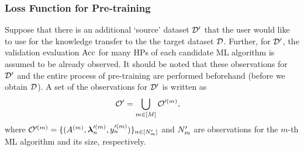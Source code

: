 \subsubsection{Loss Function for Pre-training}
\label{sssec:pre-train-formulation}


Suppose that there is an additional `source' dataset ${\mathcal D}^\prime$ that the user would like to use for the knowledge transfer to the the target dataset ${\mathcal D}$.
%
Further, for ${\mathcal D}^\prime$, the validation evaluation $\mathrm{Acc}$ for many HPs of each candidate ML algorithm is assumed to be already observed.
%
It should be noted that these observations for ${\mathcal D}^\prime$ and the entire process of pre-training are performed beforehand (before we obtain ${\mathcal D}$).
%
%
A set of the observations for ${\mathcal D}^\prime$ is written as
\begin{align}
 {\mathcal O}^\prime &= \bigcup_{m \in [M]} {\mathcal O}^{\prime (m)}, 
 \label{eq:observed_predata}
\end{align}
where 
${\mathcal O}^{\prime (m)} = \{(A^{(m)}, \boldsymbol{\lambda}_n^{\prime (m)}, y_n^{\prime (m)}) \}_{n \in [N^\prime_m]}$
and $N^\prime_m$ are observations for the $m$-th ML algorithm and its size, respectively.
%


